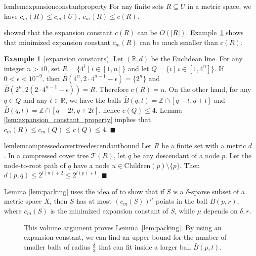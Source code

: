 \documentclass[a4paper,UKenglish,cleveref, autoref]{lipics-v2019}
\numberwithin{algocf}{section}
\theoremstyle{definition}
\theoremstyle{definition}
\newtheorem{exa}[algocf]{Example}
\theoremstyle{definition}
\theoremstyle{plain}
\newcommand{\Child}{\mathrm{Children}}
\newcommand{\R}{\mathbb{R}}
\newcommand{\T}{\mathcal{T}}
\newcommand{\bs}{\hfill $\blacksquare$}
\begin{document}
\begin{restatable}{lem}{lemexpansionconstantproperty}
\label{lem:expansion_constant_property}
For any finite sets $R\subseteq U$ in a metric space, we have $c_m(R) \leq c_m(U)$, $c_m(R) \leq c(R)$.
\end{restatable}

\cite[Example~2.6]{elkin2021new} showed that the expansion constant $c(R)$ can be $O(|R|)$. Example~\ref{exa:minimized_normal_expansion_constant} shows that minimized expansion constant $c_m(R)$ can be much smaller than $c(R)$.

\begin{exa}[expansion constants]
\label{exa:minimized_normal_expansion_constant}
Let $(\R, d)$ be the Euclidean line. 
For any integer $n>10$, set $R = \{4^{i} \mid i \in [1,n]\}$ and let $Q = \{i \mid i \in [1,4^n]\}$. 
If $0<\epsilon < 10^{-9}$, then
 $\bar{B}(4^n, 2 \cdot 4^{n-1} - \epsilon) = \{2^n\} $ and $\bar{B}(2^n, 2( 2 \cdot 4^{n-1} - \epsilon)) = R$. 
 Therefore $c(R) = n$.
On the other hand, for any $q \in Q$ and any $t \in \R$, we have the balls $\bar{B}(q,t) = \mathbb{Z} \cap [q - t, q + t]$ and 
 $\bar{B}(q,t) = \mathbb{Z} \cap [q - 2t, q + 2t]$, hence $c(Q) \leq 4$.  Lemma \ref{lem:expansion_constant_property} implies that $c_m(R) \leq c_m(Q) \leq c(Q) \leq 4$.
\bs 
\end{exa}

\begin{restatable}{lem}{lemcompressedcovertreedescendantbound}
\label{lem:compressed_cover_tree_descendant_bound}
Let $R$ be a finite set with a metric $d$. 
In a compressed cover tree $\T(R)$, let $q$ be any descendant of a node $p$. Let the node-to-root path of $q$ have a node $u \in \Child(p) \setminus \{p\}$. Then $d(p,q) \leq 2^{l(u) + 2} \leq 2^{l(p) + 1}$. 
\bs
\end{restatable}

Lemma \ref{lem:packing} uses the idea of \cite[Lemma~1]{curtin2015plug} to show that if $S$ is a $\delta$-sparse subset of a metric space $X$, then $S$ has at most $(c_m(S))^\mu$ points in the ball $\bar{B}(p,r)$, where $c_m(S)$ is the minimized expansion constant of $S$, while $\mu$ depends on $\delta,r$. 

\begin{figure}
    \centering
       
    \caption{This volume argument proves Lemma~\ref{lem:packing}. By using an expansion constant, we can find an upper bound for the number of smaller balls of radius $\frac{\delta}{2}$ that can fit inside a larger ball $\bar{B}(p, t)$. }
    \label{fig:packingLemma}
\end{figure}
\end{document}
